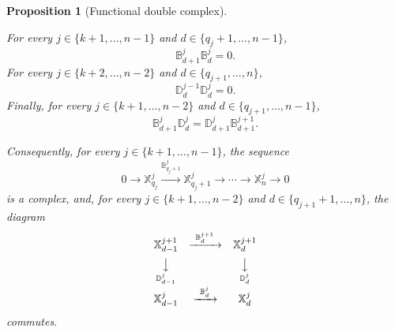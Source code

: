 \documentclass[a4paper,11pt]{article}
\newtheorem{proposition}[theorem]{Proposition}
\theoremstyle{definition}
\begin{document}
\begin{proposition}[Functional double complex]
\label{prop:functional.complex}

For every $j\in\{k+1,\ldots,n-1\}$ and $d\in\{q_j+1,\ldots,n-1\}$,
\begin{equation}\label{eq:functional.horizontal.complex}
  \mathbb B_{d+1}^j\mathbb B_d^j
  =
  0.
\end{equation}
For every $j\in\{k+2,\ldots,n-2\}$ and $d\in\{q_{j+1},\ldots,n\}$,
\begin{equation}\label{eq:functional.vertical.complex}
  \mathbb D_d^{j-1}\mathbb D_d^j
  =
  0.
\end{equation}
Finally, for every $j\in\{k+1,\ldots,n-2\}$ and $d\in\{q_{j+1},\ldots,n-1\}$,
\begin{equation}\label{eq:functional.double.complex.commutation}
  \mathbb B_{d+1}^j\mathbb D_d^j
  =
  \mathbb D_{d+1}^j\mathbb B_{d+1}^{j+1}.
\end{equation}

Consequently, for every $j\in\{k+1,\ldots,n-1\}$, the sequence
\[
0
\longrightarrow
\mathbb X_{q_j}^j
\xrightarrow{\mathbb B_{q_j+1}^j}
\mathbb X_{q_j+1}^j
\longrightarrow
\cdots
\longrightarrow
\mathbb X_n^j
\longrightarrow
0
\]
is a complex, and, for every $j\in\{k+1,\ldots,n-2\}$ and $d\in\{q_{j+1}+1,\ldots,n\}$, the diagram
\[
\begin{array}{ccc}
\mathbb X_{d-1}^{j+1}
&\xrightarrow{\ \mathbb B_d^{j+1}\ }&
\mathbb X_d^{j+1}
\\[2mm]
\underset{\mathbb D_{d-1}^{j}}{\big\downarrow}
&&
\underset{\mathbb D_d^{j}}{\big\downarrow}
\\[2mm]
\mathbb X_{d-1}^{j}
&\xrightarrow{\ \mathbb B_d^{j}\ }&
\mathbb X_d^{j}
\end{array}
\]
commutes.
\end{proposition}
\end{document}
